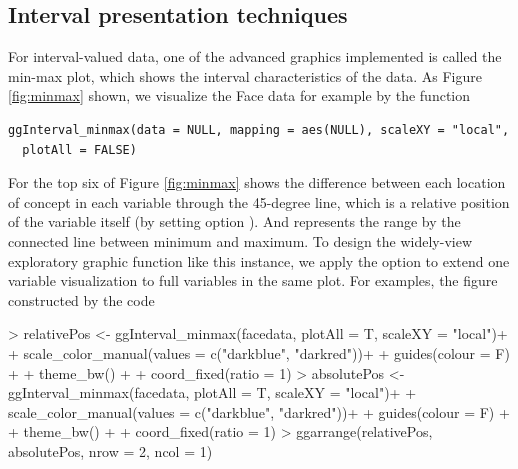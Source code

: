 \documentclass[article]{jss}
\begin{document}
\subsection{Interval presentation techniques}

For interval-valued data, one of the advanced graphics implemented is called the min-max plot, which shows the interval characteristics of the data. As Figure \ref{fig:minmax} shown, we visualize the Face data for example by the function 

\begin{verbatim}
ggInterval_minmax(data = NULL, mapping = aes(NULL), scaleXY = "local",
  plotAll = FALSE)
\end{verbatim}

For the top six of Figure \ref{fig:minmax} shows the difference between each location of concept in each variable through the 45-degree line, which is a relative position of the variable itself (by setting option ). And represents the range by the connected line between minimum and maximum. To design the widely-view exploratory graphic function like this instance, we apply the option  to extend one variable visualization to full variables in the same plot. For examples, the figure constructed by the code

\begin{Schunk}
\begin{Sinput}
> relativePos <- ggInterval_minmax(facedata, plotAll = T, scaleXY = "local")+
+       scale_color_manual(values = c("darkblue", "darkred"))+
+       guides(colour = F) + 
+       theme_bw() + 
+       coord_fixed(ratio = 1)
> absolutePos <- ggInterval_minmax(facedata, plotAll = T, scaleXY = "local")+
+       scale_color_manual(values = c("darkblue", "darkred"))+
+       guides(colour = F) + 
+       theme_bw() + 
+       coord_fixed(ratio = 1)
> ggarrange(relativePos, absolutePos, nrow = 2, ncol = 1)
\end{Sinput}
\end{Schunk}
\end{document}
